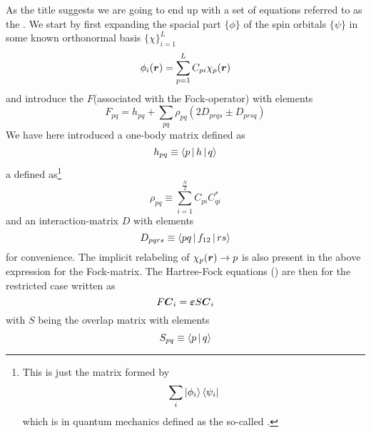         As the title suggests we are going to end up with a set of equations
        referred to as the . We start by first
        expanding the spacial part $\{\phi\}$ of the spin orbitals $\{\psi\}$
        in some known orthonormal basis $\{\chi\}^L_{i=1}$
            \begin{equation}
                \phi_i(\boldsymbol{{r}}) = \sum\limits^L_{p=1} C_{pi}\chi_p(\boldsymbol{{r}})
            \end{equation}
        and introduce the  $F$(associated with the
        Fock-operator) with elements
            \begin{equation}
                F_{pq} = h_{pq} + \sum_{pq}\rho_{pq}\left(2D_{prqs} \pm
                D_{prsq}\right)
            \end{equation}
        We have here introduced a one-body matrix defined as
            \begin{equation}
                h_{pq} \equiv \Braket{p | h | q}
            \end{equation}
        a  defined
        as\footnote{This is just the matrix formed by \begin{equation}
        \sum_i\ket{\phi_i}\bra{\psi_i}\end{equation} which is in quantum
        mechanics defined as the so-called .}
            \begin{equation}
                \rho_{pq} \equiv \sum\limits^{\frac{N}{2}}_{i=1}
                C_{pi}C^{*}_{qi}
            \end{equation}
        and an interaction-matrix $D$ with elements
            \begin{equation}
                D_{pqrs} \equiv \Braket{pq | f_{12} | rs}
            \end{equation}
        for convenience. The implicit relabeling of $\chi_p(\boldsymbol{{r}})\rightarrow p$
        is also present in the above expression for the Fock-matrix. The
        Hartree-Fock equations () are then for the
        restricted case written as
            \begin{equation}
                F\boldsymbol{{C}}_i = \boldsymbol{{\varepsilon}}S\boldsymbol{{C}}_i
            \end{equation}
        with $S$ being the overlap matrix with elements
            \begin{equation}
                S_{pq} \equiv \Braket{p | q}
            \end{equation}


